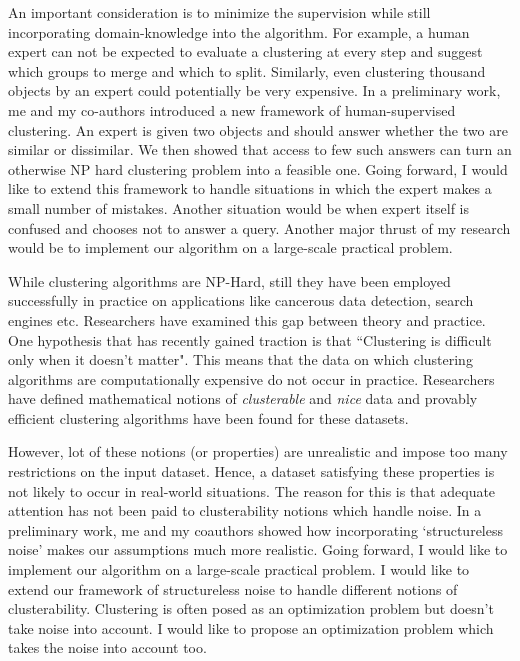 \documentclass[12pt]{article}
\begin{document}
An important consideration is to minimize the supervision while still incorporating domain-knowledge into the algorithm. For example, a human expert can not be expected to evaluate a clustering at every step and suggest which groups to merge and which to split. Similarly, even clustering thousand objects by an expert could potentially be very expensive. In a preliminary work, me and my co-authors introduced a new framework of human-supervised clustering. An expert is given two objects and should answer whether the two are similar or dissimilar. We then showed that access to few such answers can turn an otherwise NP hard clustering problem into a feasible one. Going forward, I would like to extend this framework to handle situations in which the expert makes a small number of mistakes. Another situation would be when expert itself is confused and chooses not to answer a query. Another major thrust of my research would be to implement our algorithm on a large-scale practical problem. 

While clustering algorithms are NP-Hard, still they have been employed successfully in practice on applications like cancerous data detection, search engines etc. Researchers have examined this gap between theory and practice. One hypothesis that has recently gained traction is that ``Clustering is difficult only when it doesn't matter". This means that the data on which clustering algorithms are computationally expensive do not occur in practice. Researchers have defined mathematical notions of {\em clusterable} and {\em nice} data and provably efficient clustering algorithms have been found for these datasets.

However, lot of these notions (or properties) are unrealistic and impose too many restrictions on the input dataset. Hence, a dataset satisfying these properties is not likely to occur in real-world situations. The reason for this is that adequate attention has not been paid to clusterability notions which handle noise. In a preliminary work, me and my coauthors showed how incorporating `structureless noise' makes our assumptions much more realistic. Going forward, I would like to implement our algorithm on a large-scale practical problem. I would like to extend our framework of structureless noise to handle different notions of clusterability. Clustering is often posed as an optimization problem but doesn't take noise into account. I would like to propose an optimization problem which takes the noise into account too. 
\end{document}
